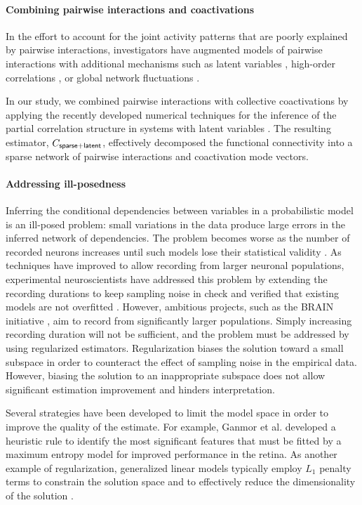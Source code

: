 \documentclass[10pt]{article}
\begin{document}
\paragraph{Combining pairwise interactions and coactivations}
In the effort to account for the joint activity patterns that are poorly explained by pairwise interactions, investigators have augmented models of pairwise interactions with additional mechanisms such as latent variables \cite{Koster:2013},  high-order correlations \cite{Ganmor:2011}, or global network fluctuations \cite{Tkacik:2013}.

In our study, we combined pairwise interactions with collective coactivations by applying the recently developed numerical techniques for the inference of the partial correlation structure in systems with latent variables \cite{Chandrasekaran:2010, Ma:2013}.  The resulting estimator, $C_{\sf sparse+latent}$, effectively decomposed the functional connectivity into a sparse network of pairwise interactions and coactivation mode vectors.

\paragraph{Addressing ill-posedness}
Inferring the conditional dependencies between variables in a probabilistic model is an ill-posed problem: small variations in the data produce large errors in the inferred network of dependencies. The problem becomes worse as the number of  recorded neurons increases until such models lose their statistical validity \cite{Roudi:2009}.  As techniques have improved to allow recording from larger neuronal populations, experimental neuroscientists have addressed this problem by extending the recording durations to keep sampling noise in check and verified that existing models are not overfitted \cite{Tkacik:2013}. However, ambitious projects, such as the BRAIN initiative  \cite{Alivisatos:2013}, aim to record from significantly larger populations. Simply increasing recording duration will not be sufficient, and the problem must be addressed by using regularized estimators. Regularization biases the solution toward a small subspace in order to counteract the effect of  sampling noise in the empirical data. However, biasing the solution to an inappropriate subspace does not allow significant estimation improvement and hinders interpretation.

Several strategies have been developed to limit the model space in order to improve the quality of the estimate. For example, Ganmor et al. \cite{Ganmor:2011} developed a heuristic rule to identify the most significant features that must be fitted by a maximum entropy model for improved performance in the retina. As another example of regularization, generalized linear models typically employ $L_1$ penalty terms to constrain the solution space and to effectively reduce the dimensionality of the solution \cite{Pillow:2008}.  
\end{document}
